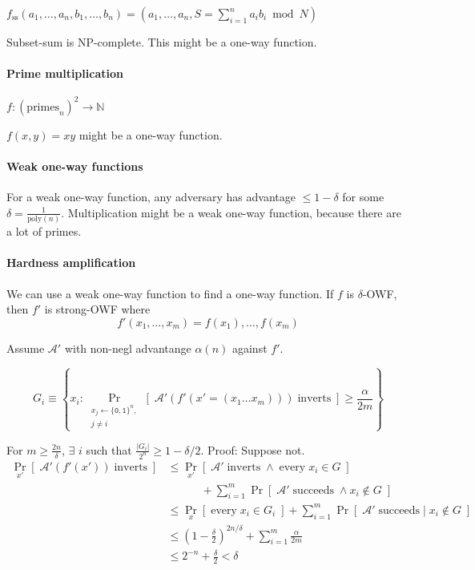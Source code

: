 \documentclass[11pt]{article}
\newcommand{\eqdef}{\ensuremath{\equiv}}
\newcommand{\bit}{\ensuremath{\{\texttt{0},\texttt{1}\}}}
\newcommand{\abs}[1]{{\ensuremath{\left\vert#1\right\vert}}}
\newcommand{\N}{\ensuremath{\mathds{N}}}
\newcommand{\AAA}{\ensuremath{\mathcal{A}}}
\theoremstyle{remark}
\begin{document}
$f_{\text{ss}}(a_1, \ldots, a_n, b_1, \ldots, b_n) = (a_1, \ldots, a_n, S = \sum_{i=1}^n a_i b_i \bmod N)$

Subset-sum is NP-complete. This might be a one-way function.

\paragraph{Prime multiplication}
$f : (\text{primes}_n)^2 \rightarrow \N$

$f(x,y) = xy$ might be a one-way function.

\paragraph{Weak one-way functions}

For a weak one-way function, any adversary has advantage $\le 1-\delta$
for some $\delta = \frac{1}{\text{poly}(n)}$.
Multiplication might be a weak one-way function, because there are a lot of primes.

\paragraph{Hardness amplification}

We can use a weak one-way function to find a one-way function.
If $f$ is $\delta$-OWF, then $f'$ is strong-OWF where
\[ f'(x_1, \ldots, x_m) = f(x_1), \ldots, f(x_m) \]

Assume $\AAA'$ with non-negl advantange $\alpha(n)$ against $f'$.

\[ G_i \eqdef \left\{ x_i : \Pr_{\substack{x_j\gets\bit^n,\\j\neq i}}[\;
  \AAA'(f'(x'=(x_1 \ldots x_m))) \; \text{inverts}
\;] \ge \frac{\alpha}{2m} \right\} \]

For $m \ge \frac{2n}{\delta}$,
$\exists$ $i$ such that $\frac{\abs{G_i}}{2^n} \ge 1-\delta/2$.
Proof: Suppose not.
\begin{align*}
\Pr_{x'}[\;\AAA'(f'(x'))\;\text{inverts}\;]
&\le \Pr_{x'}[\;\AAA'\;\text{inverts}\;\wedge\;\text{every}\;x_i\in G\;] \\
 &\hspace{3em}+ \sum_{i=1}^m \Pr[\;\AAA' \;\text{succeeds}\;\wedge x_i \not\in G\;] \\
&\le \Pr_x[\;\text{every}\;x_i \in G_i\;]
 + \sum_{i=1}^m \Pr[\;\AAA' \;\text{succeeds}\;|\;x_i \not\in G\;] \\
&\le (1-\frac{\delta}{2})^{2n/\delta} + \sum_{i=1}^m \frac{\alpha}{2m} \\
&\le 2^{-n} + \frac{\delta}{2} < \delta
\end{align*}
\end{document}
